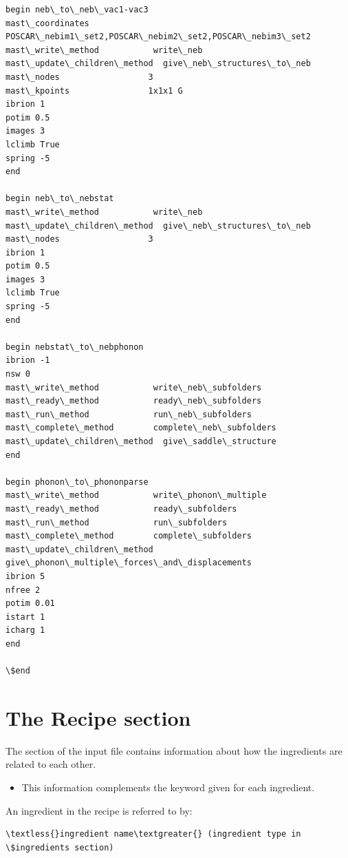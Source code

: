 \documentclass[letterpaper,10pt,english]{sphinxmanual}
\begin{document}
\begin{Verbatim}[commandchars=\\\{\}]
begin neb\_to\_neb\_vac1-vac3
mast\_coordinates            POSCAR\_nebim1\_set2,POSCAR\_nebim2\_set2,POSCAR\_nebim3\_set2
mast\_write\_method           write\_neb
mast\_update\_children\_method  give\_neb\_structures\_to\_neb
mast\_nodes                  3
mast\_kpoints                1x1x1 G
ibrion 1
potim 0.5
images 3
lclimb True
spring -5
end

begin neb\_to\_nebstat
mast\_write\_method           write\_neb
mast\_update\_children\_method  give\_neb\_structures\_to\_neb
mast\_nodes                  3
ibrion 1
potim 0.5
images 3
lclimb True
spring -5
end

begin nebstat\_to\_nebphonon
ibrion -1
nsw 0
mast\_write\_method           write\_neb\_subfolders
mast\_ready\_method           ready\_neb\_subfolders
mast\_run\_method             run\_neb\_subfolders
mast\_complete\_method        complete\_neb\_subfolders
mast\_update\_children\_method  give\_saddle\_structure
end

begin phonon\_to\_phononparse
mast\_write\_method           write\_phonon\_multiple
mast\_ready\_method           ready\_subfolders
mast\_run\_method             run\_subfolders
mast\_complete\_method        complete\_subfolders
mast\_update\_children\_method  give\_phonon\_multiple\_forces\_and\_displacements
ibrion 5
nfree 2
potim 0.01
istart 1
icharg 1
end

\$end
\end{Verbatim}


\section{The Recipe section}
\label{3_1_3_recipe:the-recipe-section}\label{3_1_3_recipe::doc}
The  section of the input file contains information about how the ingredients are related to each other.
\begin{itemize}
\item {} 
This information complements the  keyword given for each ingredient.

\end{itemize}

An ingredient in the recipe is referred to by:

\begin{Verbatim}[commandchars=\\\{\}]
\textless{}ingredient name\textgreater{} (ingredient type in \$ingredients section)
\end{Verbatim}
\end{document}
